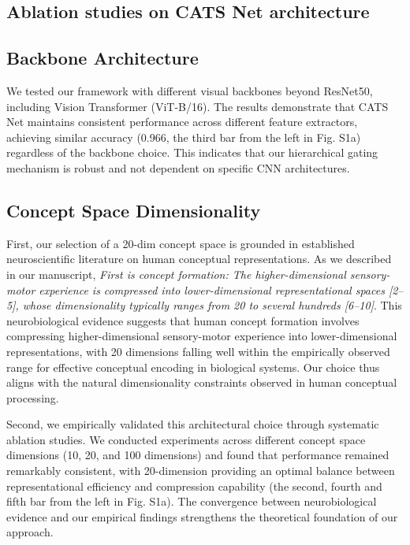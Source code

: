 \documentclass[pdflatex,sn-mathphys-num,lineno]{sn-jnl}%
\begin{document}
\begin{CJK}{UTF8}{gbsn}



\maketitle

\section{Ablation studies on CATS Net architecture}

\subsection{Backbone Architecture}
We tested our framework with different visual backbones beyond ResNet50, including Vision Transformer (ViT-B/16). The results demonstrate that CATS Net maintains consistent performance across different feature extractors, achieving similar accuracy (0.966, the third bar from the left in Fig. S1a) regardless of the backbone choice. This indicates that our hierarchical gating mechanism is robust and not dependent on specific CNN architectures.

\subsection{Concept Space Dimensionality}
First, our selection of a 20-dim concept space is grounded in established neuroscientific literature on human conceptual representations. As we described in our manuscript, \textit{First is concept formation: The higher-dimensional sensory-motor experience is compressed into lower-dimensional representational spaces [2–5], whose dimensionality typically ranges from 20 to several hundreds [6–10]}. This neurobiological evidence suggests that human concept formation involves compressing higher-dimensional sensory-motor experience into lower-dimensional representations, with 20 dimensions falling well within the empirically observed range for effective conceptual encoding in biological systems. Our choice thus aligns with the natural dimensionality constraints observed in human conceptual processing.

Second, we empirically validated this architectural choice through systematic ablation studies. We conducted experiments across different concept space dimensions (10, 20, and 100 dimensions) and found that performance remained remarkably consistent, with 20-dimension providing an optimal balance between representational efficiency and compression capability (the second, fourth and fifth bar from the left in Fig. S1a). The convergence between neurobiological evidence and our empirical findings strengthens the theoretical foundation of our approach.


\end{CJK}
\end{document}
